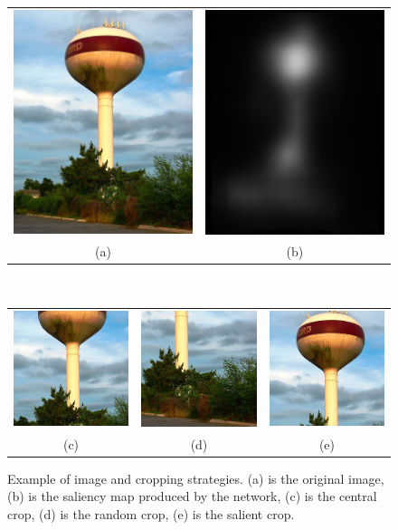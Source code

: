 \documentclass[12pt]{article}
\begin{document}
\begin{figure}
\scriptsize
\begin{center}
    \begin{tabular} {cc}
    \includegraphics[width=0.25\linewidth]{./img/crops/11-raw.JPEG} &
    \includegraphics[width=0.25\linewidth]{./img/crops/11-sals.png} \\
    (a) & (b) \\
    \end{tabular}\\
    \begin{tabular} {ccc}
    \includegraphics[width=0.2\linewidth]{./img/crops/11-central.JPEG} &
    \includegraphics[width=0.2\linewidth]{./img/crops/11-rand.JPEG} &
    \includegraphics[width=0.2\linewidth]{./img/crops/11-soft.JPEG} \\
    (c) & (d) & (e)\\
    \end{tabular}
\caption{\small Example of image and cropping strategies.
    (a) is the original image, (b) is the saliency map produced by the network,
    (c) is the central crop, (d) is the random crop, (e) is the salient crop.}
\label{fig:exp3}
\end{center}
\end{figure}
\end{document}
